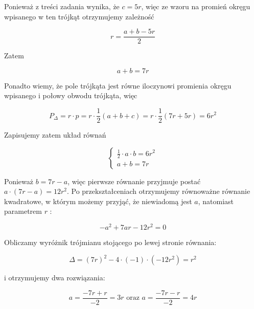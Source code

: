 \documentclass[10pt]{article}
\begin{document}
Ponieważ z treści zadania wynika, że $c=5 r$, więc ze wzoru na promień okręgu wpisanego w ten trójkąt otrzymujemy zależność

$$
r=\frac{a+b-5 r}{2}
$$

Zatem

$$
a+b=7 r
$$

Ponadto wiemy, że pole trójkąta jest równe iloczynowi promienia okręgu wpisanego i połowy obwodu trójkąta, więc

$$
P_{\Delta}=r \cdot p=r \cdot \frac{1}{2}(a+b+c)=r \cdot \frac{1}{2}(7 r+5 r)=6 r^{2}
$$

Zapisujemy zatem układ równań

$$
\left\{\begin{array}{l}
\frac{1}{2} \cdot a \cdot b=6 r^{2} \\
a+b=7 r
\end{array}\right.
$$

Ponieważ $b=7 r-a$, więc pierwsze równanie przyjmuje postać $a \cdot(7 r-a)=12 r^{2}$. Po przekształceniach otrzymujemy równoważne równanie kwadratowe, w którym możemy przyjąć, że niewiadomą jest $a$, natomiast parametrem $r$ :

$$
-a^{2}+7 a r-12 r^{2}=0
$$

Obliczamy wyróżnik trójmianu stojącego po lewej stronie równania:

$$
\Delta=(7 r)^{2}-4 \cdot(-1) \cdot\left(-12 r^{2}\right)=r^{2}
$$

i otrzymujemy dwa rozwiązania:

$$
a=\frac{-7 r+r}{-2}=3 r \text { oraz } a=\frac{-7 r-r}{-2}=4 r
$$
\end{document}

